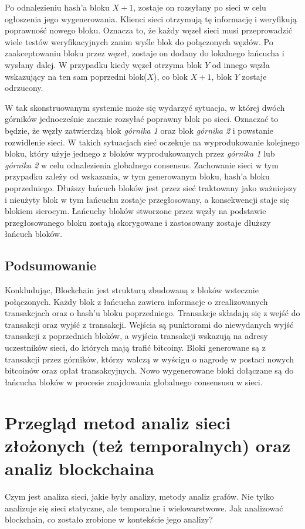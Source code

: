 \documentclass[12pt, twoside, final, openany]{mgr}
\begin{document}
\indent Po odnalezieniu hash'a bloku $X+1$, zostaje on rozsyłany po sieci w celu ogłoszenia jego wygenerowania. Klienci sieci otrzymują tę informację i weryfikują poprawność nowego bloku. Oznacza to, że każdy węzeł sieci musi przeprowadzić wiele testów weryfikacyjnych zanim wyśle blok do połączonych węzłów. Po zaakceptowaniu bloku przez węzeł, zostaje on dodany do lokalnego łańcucha i wysłany dalej. W przypadku kiedy węzeł otrzyma blok $Y$ od innego węzła wskazujący na ten sam poprzedni blok($X$), co blok $X+1$, blok $Y$ zostaje odrzucony.

\indent W tak skonstruowanym systemie może się wydarzyć sytuacja, w której dwóch górników jednocześnie zacznie rozsyłać poprawny blok po sieci. Oznaczać to będzie, że węzły zatwierdzą blok \textit{górnika 1} oraz blok \textit{górnika 2} i powstanie rozwidlenie sieci. W takich sytuacjach sieć oczekuje na wyprodukowanie kolejnego bloku, który użyje jednego z bloków wyprodukowanych przez \textit{górnika 1} lub \textit{górnika 2} w celu odnalezienia globalnego consensus. Zachowanie sieci w tym przypadku zależy od wskazania, w tym generowanym bloku, hash'a bloku poprzedniego. Dłuższy łańcuch bloków jest przez sieć traktowany jako ważniejszy i nieużyty blok w tym łańcuchu zostaje przegłosowany, a konsekwencji staje się blokiem sierocym. Łańcuchy bloków stworzone przez węzły na podstawie przegłosowanego bloku zostają skorygowane i zastosowany zostaje dłuższy łańcuch bloków.

\section{Podsumowanie}

\indent Konkludując, Blockchain jest strukturą zbudowaną z bloków wstecznie połączonych. Każdy blok z łańcucha zawiera informacje o zrealizowanych transakcjach oraz o hash'u bloku poprzedniego. Transakcje składają się z wejść do transakcji oraz wyjść z transakcji. Wejścia są punktorami do niewydanych wyjść transakcji z poprzednich bloków, a wyjścia transakcji wskazują na adresy uczestników sieci, do których mają trafić bitcoiny. Bloki generowane są z transakcji przez górników, którzy walczą w wyścigu o nagrodę w postaci nowych bitcoinów oraz opłat transakcyjnych. Nowo wygenerowane bloki dołączane są do łańcucha bloków w procesie znajdowania globalnego consensusu w sieci.

\chapter{Przegląd metod analiz sieci złożonych (też temporalnych) oraz analiz blockchaina}
Czym jest analiza sieci, jakie były analizy, metody analiz grafów.
Nie tylko analizuje się sieci statyczne, ale temporalne i wielowarstwowe.
Jak analizować blockchain, co zostało zrobione w kontekście jego analizy?
\end{document}
